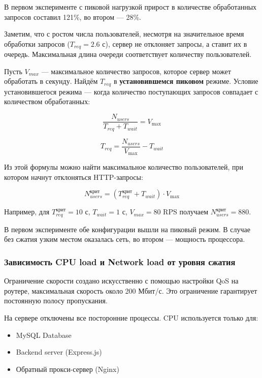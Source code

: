 \documentclass[12pt]{article}
\begin{document}
В первом эксперименте с пиковой нагрузкой прирост в количестве обработанных запросов составил 121\%, во втором — 28\%.

Заметим, что с ростом числа пользователей, несмотря на значительное время обработки запросов ($T_{req}=2.6$ с), сервер не отклоняет запросы,
а ставит их в очередь. Максимальная длина очереди соответствует количеству пользователей.

Пусть $V_{max}$ — максимальное количество запросов, которое сервер может обработать в секунду. Найдём $T_{req}$ в \textbf{установившемся пиковом} режиме.
Условие установившегося режима — когда количество поступающих запросов совпадает с количеством обработанных:

\[
    \frac{N_{users}}{T_{req} + T_{wait}} = V_{\text{max}}
\]

\[
    T_{req} = \frac{N_{users}}{V_{\text{max}}} - T_{wait}
\]

Из этой формулы можно найти максимальное количество пользователей, при котором начнут отклоняться HTTP-запросы:

\begin{equation}
    N^{\text{крит}}_{users} = (T^{\text{крит}}_{req} + T_{wait}) \cdot V_{\text{max}}
\end{equation}

Например, для $T^{\text{крит}}_{req} = 10$ с, $T_{wait}=1$ с, $V_{max}=80$ RPS получаем $N^{\text{крит}}_{users}=880$.

В первом эксперименте обе конфигурации вышли на пиковый режим. В случае без сжатия узким местом оказалась сеть, во втором — мощность процессора.

\subsubsection{Зависимость CPU load и Network load от уровня сжатия}

Ограничение скорости создано искусственно с помощью настройки QoS на роутере, максимальная скорость около 200 Мбит/с. Это ограничение гарантирует постоянную полосу пропускания.

На сервере отключены все посторонние процессы. CPU используется только для:
\begin{itemize}
    \item MySQL Database
    \item Backend server (Express.js)
    \item Обратный прокси-сервер (Nginx)
\end{itemize}
\end{document}

